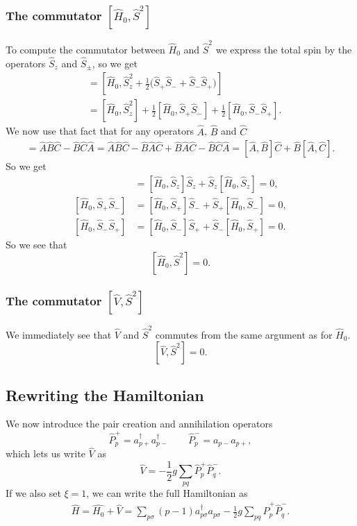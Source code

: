 \documentclass[a4paper, 11pt, notitlepage, english]{article}
\newcommand{\op}[1]{\hat{#1}}
\begin{document}
\clearpage

\subsubsection*{The commutator $[\op{H}_0, \op{S}^2]$}

To compute the commutator between $\op{H}_0$ and $\op{S}^2$ we express the total spin by the operators $\op{S}_z$ and $\op{S}_\pm$, so we get
\begin{align*}
[\op{H}_0, \op{S}^2] &= [\op{H}_0, \op{S}_z^2 + \frac{1}{2}\big(\op{S}_+\op{S}_- + \op{S}_-\op{S}_+\big)] \\
&= [\op{H}_0, \op{S}_z^2] + \frac{1}{2}[\op{H}_0, \op{S}_+\op{S}_-] + \frac{1}{2}[\op{H}_0, \op{S}_-\op{S}_+].
\end{align*}
We now use that fact that for any operators $\op{A}$, $\op{B}$ and $\op{C}$
\begin{align*}
[\op{A},\op{B}\op{C}] = \op{A}\op{B}\op{C} - \op{B}\op{C}\op{A} = \op{A}\op{B}\op{C} - \op{B}\op{A}\op{C} + \op{B}\op{A}\op{C} - \op{B}\op{C}\op{A} = [\op{A},\op{B}]\op{C} + \op{B}[\op{A},\op{C}].
\end{align*}
So we get
\begin{align*}
[\op{H}_0, \op{S}_z^2] &= [\op{H}_0, \op{S}_z]\op{S}_z + \op{S}_z[\op{H}_0, \op{S}_z] = 0, \\
[\op{H}_0, \op{S}_+\op{S}_-] &= [\op{H}_0, \op{S}_+]\op{S}_- + \op{S}_+[\op{H}_0, \op{S}_-] = 0, \\
[\op{H}_0, \op{S}_-\op{S}_+] &= [\op{H}_0, \op{S}_-]\op{S}_+ + \op{S}_-[\op{H}_0, \op{S}_+] = 0.
\end{align*}
So we see that 
$$[\op{H}_0, \op{S}^2] = 0.$$

\subsubsection*{The commutator $[\op{V}, \op{S}^2]$}

We immediately see that $\op{V}$ and $\op{S}^2$ commutes from the same argument as for $\op{H}_0$.
$$[\op{V}, \op{S}^2] = 0.$$

\subsection*{Rewriting the Hamiltonian}

We now introduce the pair creation and annihilation operators
$$\op{P}_p^+ = a_{p+}^\dagger a_{p-}^\dagger \qquad \op{P}_p^- = a_{p-} a_{p+},$$
which lets us write $\op{V}$ as
$$\op{V} = -\frac{1}{2}g \sum_{pq} \op{P}_p^+ \op{P}_q^-.$$
If we also set $\xi=1$, we can write the full Hamiltonian as 
\begin{align*}
	\op{H} = \op{H_0} + \op{V} = \sum_{p \sigma} (p-1)a_{p\sigma}^\dagger a_{p\sigma}-\frac{1}{2}g \sum_{pq} \op{P}_p^+ \op{P}_q^-.
\end{align*}
\end{document}
